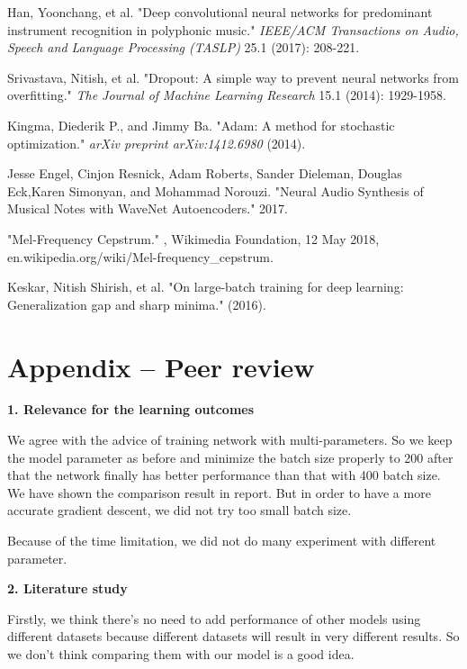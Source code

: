\documentclass{article}
\begin{document}
\begin{thebibliography}{9}
Han, Yoonchang, et al. "Deep convolutional neural networks for predominant instrument recognition in polyphonic music." \textit{IEEE/ACM Transactions on Audio, Speech and Language Processing (TASLP)} 25.1 (2017): 208-221.

Srivastava, Nitish, et al. "Dropout: A simple way to prevent neural networks from overfitting." \textit{The Journal of Machine Learning Research} 15.1 (2014): 1929-1958.

Kingma, Diederik P., and Jimmy Ba. "Adam: A method for stochastic optimization." \textit{arXiv preprint arXiv:1412.6980} (2014).

Jesse Engel, Cinjon Resnick, Adam Roberts, Sander Dieleman, Douglas Eck,Karen Simonyan, and Mohammad Norouzi. "Neural Audio Synthesis of Musical Notes with WaveNet Autoencoders." 2017.

"Mel-Frequency Cepstrum." , Wikimedia Foundation, 12 May 2018, en.wikipedia.org/wiki/Mel-frequency\_cepstrum.

Keskar, Nitish Shirish, et al. "On large-batch training for deep learning: Generalization gap and sharp minima." (2016).

\end{thebibliography}

\clearpage

\section*{Appendix -- Peer review}

\noindent \textbf{1. Relevance for the learning outcomes}

We agree with the advice of training network with multi-parameters. So we keep the model parameter as before and minimize the batch size properly to 200 after that the network finally has better performance than that with 400 batch size. We have shown the comparison result in report. But in order to have a more accurate gradient descent, we did not try too small batch size. 

Because of the time limitation, we did not do many experiment with different parameter.

\noindent \textbf{2. Literature study}

Firstly, we think there's no need to add performance of other models using different datasets because different datasets will result in very different results. So we don't think comparing them with our model is a good idea.
\end{document}
